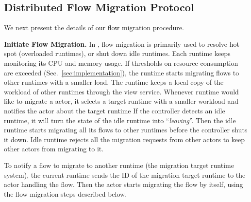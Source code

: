 
\subsection{Distributed Flow Migration Protocol}

We next present the details of our flow migration procedure. 


\textbf{Initiate Flow Migration.} In \nfactor, flow migration is primarily used to resolve hot spot (overloaded runtimes), or shut down idle runtimes. Each runtime keeps monitoring its CPU and memory usage. If thresholds on resource consumption are exceeded (Sec.~\ref{sec:implementation}), the runtime starts migrating flows to other runtimes with a smaller load. The runtime keeps a local copy of the workload of other runtimes through the view service. Whenever runtime would like to migrate a actor, it selects a target runtime with a smaller workload and notifies the actor about the target runtime%
If the controller detects an idle runtime, it will turn the state of the idle runtime into ``\textit{leaving}''. Then the idle runtime starts migrating all its flows to other runtimes before the controller shuts it down. Idle runtime rejects all the migration requests from other actors to keep other actors from migrating to it. %

To notify a flow to migrate to another runtime (the migration target runtime system), the current runtime sends the ID of the migration target runtime to the actor handling the flow. Then the actor starts migrating the flow by itself, using the flow migration steps described below. %



